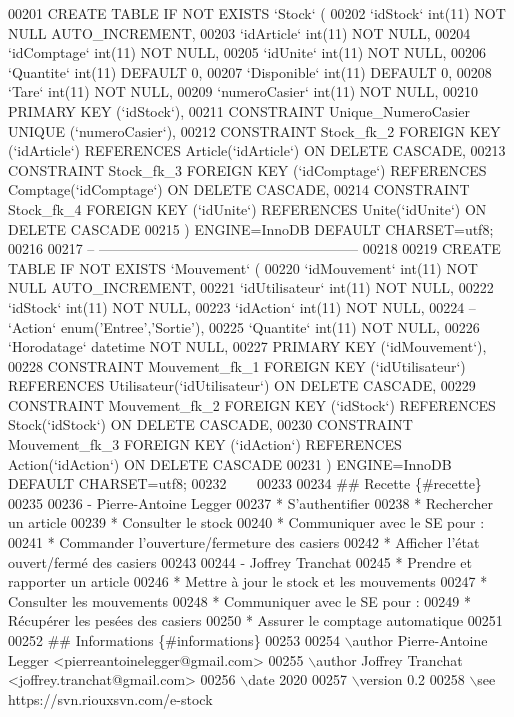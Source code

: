 \begin{DoxyCode}
00201 CREATE TABLE IF NOT EXISTS `Stock` (
00202   `idStock` int(11) NOT NULL AUTO\_INCREMENT,
00203   `idArticle` int(11) NOT NULL,
00204   `idComptage` int(11) NOT NULL,
00205   `idUnite` int(11) NOT NULL,
00206   `Quantite` int(11) DEFAULT 0,
00207   `Disponible` int(11) DEFAULT 0,
00208   `Tare` int(11) NOT NULL,  
00209   `numeroCasier` int(11) NOT NULL,
00210   PRIMARY KEY (`idStock`),
00211   CONSTRAINT Unique\_NumeroCasier UNIQUE (`numeroCasier`),
00212   CONSTRAINT Stock\_fk\_2 FOREIGN KEY (`idArticle`) REFERENCES Article(`idArticle`) ON DELETE CASCADE,
00213   CONSTRAINT Stock\_fk\_3 FOREIGN KEY (`idComptage`) REFERENCES Comptage(`idComptage`) ON DELETE
       CASCADE,
00214   CONSTRAINT Stock\_fk\_4 FOREIGN KEY (`idUnite`) REFERENCES Unite(`idUnite`) ON DELETE CASCADE
00215 ) ENGINE=InnoDB DEFAULT CHARSET=utf8;
00216 
00217 -- --------------------------------------------------------
00218 
00219 CREATE TABLE IF NOT EXISTS `Mouvement` (
00220   `idMouvement` int(11) NOT NULL AUTO\_INCREMENT, 
00221   `idUtilisateur` int(11) NOT NULL,
00222   `idStock` int(11) NOT NULL,
00223   `idAction` int(11) NOT NULL,
00224   --   `Action` enum('Entree','Sortie'),
00225   `Quantite` int(11) NOT NULL,
00226   `Horodatage` datetime NOT NULL,
00227   PRIMARY KEY (`idMouvement`),
00228   CONSTRAINT Mouvement\_fk\_1 FOREIGN KEY (`idUtilisateur`) REFERENCES Utilisateur(`idUtilisateur`) ON
       DELETE CASCADE,
00229   CONSTRAINT Mouvement\_fk\_2 FOREIGN KEY (`idStock`) REFERENCES Stock(`idStock`) ON DELETE CASCADE,
00230   CONSTRAINT Mouvement\_fk\_3 FOREIGN KEY (`idAction`) REFERENCES Action(`idAction`) ON DELETE CASCADE
00231 ) ENGINE=InnoDB DEFAULT CHARSET=utf8;
00232 ~~~
00233 
00234 ## Recette \{#recette\}
00235 
00236 - Pierre-Antoine Legger
00237     * S'authentifier
00238     * Rechercher un article
00239     * Consulter le stock
00240     * Communiquer avec le SE pour :
00241         * Commander l'ouverture/fermeture des casiers
00242         * Afficher l'état ouvert/fermé des casiers
00243 
00244 - Joffrey Tranchat
00245     * Prendre et rapporter un article
00246     * Mettre à jour le stock et les mouvements
00247     * Consulter les mouvements
00248     * Communiquer avec le SE pour :
00249     * Récupérer les pesées des casiers
00250     * Assurer le comptage automatique
00251 
00252 ## Informations \{#informations\}
00253 
00254 \(\backslash\)author Pierre-Antoine Legger <pierreantoinelegger@gmail.com>
00255 \(\backslash\)author Joffrey Tranchat <joffrey.tranchat@gmail.com>
00256 \(\backslash\)date 2020
00257 \(\backslash\)version 0.2
00258 \(\backslash\)see https://svn.riouxsvn.com/e-stock

\end{DoxyCode}
